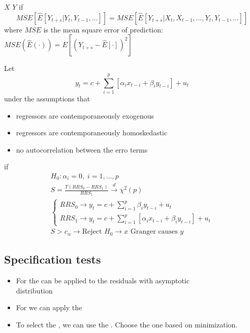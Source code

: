 \begin{definition}
    $X$  $Y$ if 
    \begin{equation*}
        MSE[\hat{E}[Y_{t+s}|Y_t, Y_{t-1},\ldots]] = MSE[\hat{E}[Y_{t+s}|X_t,X_{t-1},\ldots,Y_t,Y_{t-1},\ldots]]
    \end{equation*}
    where $MSE$ is the mean square error of prediction: $MSE(\hat{E}(\cdot)) = E[(Y_{t+s}-\hat{E}[\cdot])^2]$
\end{definition}

Let
\begin{equation*}
    y_t = c + \sum_{i=1}^{p} [\alpha_i x_{t-i} + \beta_i y_{t-i}] + u_t
\end{equation*}
under the assumptions that
\begin{itemize}
    \item regressors are contemporaneously exogenous
    \item regressors are contemporaneously homoskedastic
    \item no autocorrelation between the erro terms
\end{itemize}
 if 
\begin{gather*}
    H_0: \alpha_i = 0,\; i= 1,\ldots,p\\
    S = \frac{T(RRS_0 - RRS_1)}{RRS_1}\xrightarrow{d}\chi^2(p)\\
    \begin{cases}
        RRS_0 \to y_t = c + \sum_{i=1}^{p} \beta_i y_{t-i} + u_t\\
        RRS_1 \to y_t = c + \sum_{i=1}^{p} [\alpha_i x_{t-i} + \beta_i y_{t-i}] + u_t
    \end{cases}\\
    S > c_{\alpha} \to \text{Reject }H_0 \to x\text{ Granger causes }y
\end{gather*}

\subsection{Specification tests}

\begin{itemize}
    \item For  the  can be applied to the residuals with asymptotic \\ distribution
    \item For  we can apply the 
    \item To select the , we can use the . Choose the one based on minimization.
\end{itemize}

